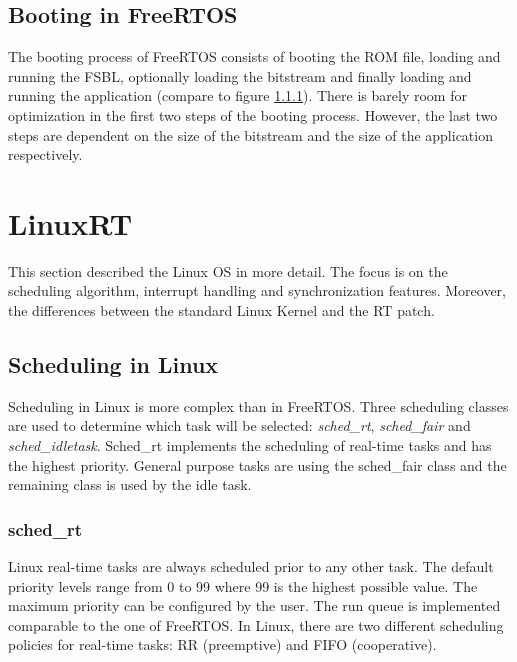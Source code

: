 \subsection{Booting in FreeRTOS}
The booting process of FreeRTOS consists of booting the \ac{ROM} file, loading and running the \ac{FSBL}, optionally loading the bitstream and finally loading and running the application (compare to figure \ref{}).
There is barely room for optimization in the first two steps of the booting process. 
However, the last two steps are dependent on the size of the bitstream and the size of the application respectively.

\section{LinuxRT}
This section described the Linux \ac{OS} in more detail.
The focus is on the scheduling algorithm, interrupt handling and synchronization features.
Moreover, the differences between the standard Linux Kernel and the RT patch.

\subsection{Scheduling in Linux}\label{ss_scheduling_in_linux} 
Scheduling in Linux \cite{love:lkd} \cite{jones:itlcfss} is more complex than in FreeRTOS.
Three scheduling classes are used to determine which task will be selected: \textit{sched\_rt}, \textit{sched\_fair} and \textit{sched\_idletask}.
Sched\_rt implements the scheduling of real-time tasks and has the highest priority. 
General purpose tasks are using the sched\_fair class and the remaining class is used by the idle task.

\subsubsection{sched\_rt} 
Linux real-time tasks are always scheduled prior to any other task. 
The default priority levels range from 0 to 99 where 99 is the highest possible value.
The maximum priority can be configured by the user. 
The run queue is implemented comparable to the one of FreeRTOS. 
In Linux, there are two different scheduling policies for real-time tasks: \ac{RR} (preemptive) and \ac{FIFO} (cooperative).

